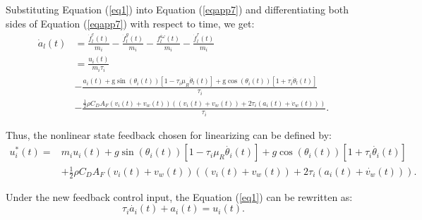\documentclass[a4paper]{cas-sc}
\begin{document}
Substituting Equation (\ref{eq1}) into Equation (\ref{eqapp7}) and differentiating both sides of Equation (\ref{eqapp7}) with respect to time, we get:
\begin{equation}
  \begin{aligned}
    \dot{a}_{l}(t) & =\frac{\dot{f}_{l}^{e}(t)}{m_{i}}-\frac{\dot{f}_{l}^{g}(t)}{m_{i}}-\frac{f_{l}^{i \omega}(t)}{m_{i}}-\frac{\dot{f}_{l}^{r}(t)}{m_{i}}                                                                                         \\
                   & =               \frac{u_{i}(t)}{m_{i} \tau_{i}}                                                                                                                                                                               \\
                   & -               \frac{a_{i}(t)+\mathrm{g} \sin \left(\theta_{i}(t)\right)\left[1-\tau_{i} \mu_{R} \dot{\theta}_{l}(t)\right]+\mathrm{g} \cos \left(\theta_{i}(t)\right)\left[1+\tau_{i} \dot{\theta}_{l}(t)\right]}{\tau_{i}} \\
                   & -               \frac{\frac{1}{2} \rho C_{D} A_{F}\left(v_{i}(t)+v_{w}(t)\right)\left(\left(v_{i}(t)+v_{w}(t)\right)+2 \tau_{i}\left(a_{i}(t)+\dot{v}_{w}(t)\right)\right)}{\tau_{i}}.
  \end{aligned}
  \label{eqapp8}
\end{equation}

Thus, the nonlinear state feedback chosen for linearizing can be defined by:
\begin{equation}
  \begin{aligned}
    u_i^\ast\left(t\right)= & m_iu_i\left(t\right)+g\sin{\left(\theta_i\left(t\right)\right)}\left[1-\tau_i\mu_R\dot{\theta_i}\left(t\right)\right]+g\cos{\left(\theta_i\left(t\right)\right)}\left[1+\tau_i\dot{\theta_i}\left(t\right)\right]\ \\
                            & +\frac{1}{2}\rho C_DA_F\left(v_i\left(t\right)+v_w\left(t\right)\right)\left(\left(v_i\left(t\right)+v_w\left(t\right)\right)+2\tau_i(a_i\left(t\right)+\dot{v_w}\left(t\right))\right).
  \end{aligned}
  \label{eqapp9}
\end{equation}

Under the new feedback control input, the Equation (\ref{eq1}) can be rewritten as:
\begin{equation}
  \tau_i\dot{a_i}\left(t\right)+a_i\left(t\right)=u_i(t).
  \label{eqapp10}
\end{equation}
\end{document}
